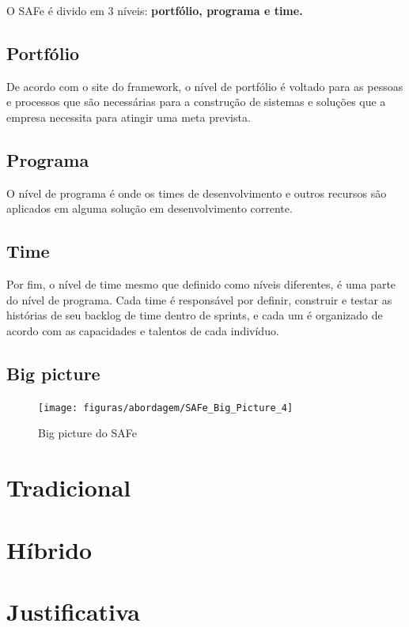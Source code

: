 O SAFe é divido em 3 níveis: \textbf{portfólio, programa e time.}


\subsection{Portfólio}
De acordo com o site do framework, o nível de portfólio é voltado para as pessoas e processos que são necessárias para a construção de sistemas e soluções que a empresa necessita para atingir uma meta prevista. 

\subsection{Programa}
O nível de programa é onde os times de desenvolvimento e outros recursos são aplicados em alguma solução em desenvolvimento corrente.

\subsection{Time}
Por fim, o nível de time mesmo que definido como níveis diferentes, é uma parte do nível de programa. Cada time é responsável por definir, construir e testar as histórias de seu backlog de time dentro de sprints, e cada um é organizado de acordo com as capacidades e talentos de cada indivíduo.

\subsection{Big picture}
\begin{figure}[!htpb]
	\centering
	\texttt{[image: figuras/abordagem/SAFe\_Big\_Picture\_4]}
	\caption{Big picture do SAFe}
\end{figure}

\section{Tradicional}

\section{Híbrido}

\section{Justificativa}
